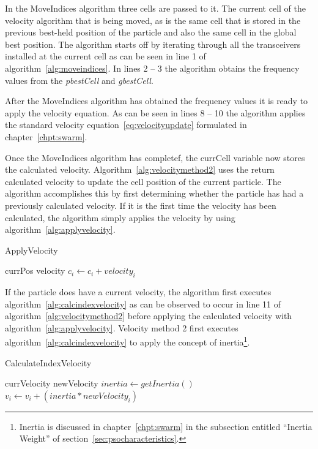 In the MoveIndices algorithm three cells are passed to it. The current cell of the velocity algorithm that is being moved, as is the same cell that is stored in the previous best-held position of the particle and also the same cell in the global best position. The algorithm starts off by iterating through all the transceivers installed at the current cell as can be seen in line 1 of algorithm~\ref{alg:moveindices}. In lines 2 -- 3 the algorithm obtains the frequency values from the \emph{pbestCell} and \emph{gbestCell}.

After the MoveIndices algorithm has obtained the frequency values it is ready to apply the velocity equation. As can be seen in lines 8 -- 10 the algorithm applies the standard velocity equation~\ref{eq:velocityupdate} formulated in chapter~\ref{chpt:swarm}. 

Once the MoveIndices algorithm has completef, the currCell variable now stores the calculated velocity. Algorithm~\ref{alg:velocitymethod2} uses the return calculated velocity to update the cell position of the current particle. The algorithm accomplishes this by first determining whether the particle has had a previously calculated velocity. If it is the first time the velocity has been calculated, the algorithm simply applies the velocity by using algorithm~\ref{alg:applyvelocity}. 

\begin{algorithm}
\caption{ApplyVelocity}
\label{alg:applyvelocity}
\begin{algorithmic}[1]
	\Require currPos
	\Require velocity
		\State $c_i \leftarrow c_i + velocity_i$
	\EndFor
\end{algorithmic}
\end{algorithm}

If the particle does have a current velocity, the algorithm first executes algorithm~\ref{alg:calcindexvelocity} as can be observed to occur in line 11 of algorithm~\ref{alg:velocitymethod2} before applying the calculated velocity with algorithm~\ref{alg:applyvelocity}. Velocity method 2 first executes algorithm~\ref{alg:calcindexvelocity} to apply the concept of inertia\footnote{Inertia is discussed in chapter~\ref{chpt:swarm} in the subsection entitled ``Inertia Weight'' of section~\ref{sec:psocharacteristics}.}.

\begin{algorithm}
\caption{CalculateIndexVelocity}
\label{alg:calcindexvelocity}
\begin{algorithmic}[1]
	\Require currVelocity
	\Require newVelocity
		\State $inertia \leftarrow getInertia()$
		\State $v_i \leftarrow v_i + (inertia * newVelocity_i)$
	\EndFor
\end{algorithmic}
\end{algorithm}

